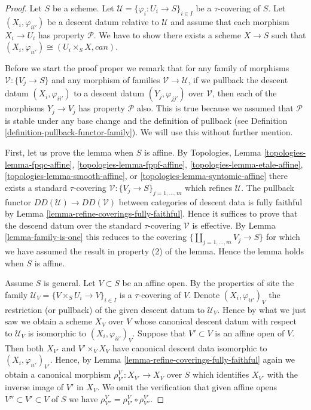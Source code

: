 \begin{proof}
Let $S$ be a scheme.
Let $\mathcal{U} = \{\varphi_i : U_i \to S\}_{i \in I}$
be a $\tau$-covering of $S$.
Let $(X_i, \varphi_{ii'})$ be a descent datum relative to
$\mathcal{U}$ and assume that each morphism $X_i \to U_i$ has property
$\mathcal{P}$. We have to show there exists a scheme $X \to S$ such that
$(X_i, \varphi_{ii'}) \cong (U_i \times_S X, can)$.

\medskip\noindent
Before we start the proof proper we remark that for any
family of morphisms $\mathcal{V} : \{V_j \to S\}$ and any
morphism of families $\mathcal{V} \to \mathcal{U}$, if we pullback
the descent datum $(X_i, \varphi_{ii'})$ to a descent datum
$(Y_j, \varphi_{jj'})$ over $\mathcal{V}$, then each of the
morphisms $Y_j \to V_j$ has property $\mathcal{P}$ also.
This is true because we assumed that $\mathcal{P}$ is stable
under any base change and the definition of pullback
(see Definition \ref{definition-pullback-functor-family}).
We will use this without further mention.

\medskip\noindent
First, let us prove the lemma when $S$ is affine.
By Topologies, Lemma
\ref{topologies-lemma-fpqc-affine},
\ref{topologies-lemma-fppf-affine},
\ref{topologies-lemma-etale-affine},
\ref{topologies-lemma-smooth-affine}, or
\ref{topologies-lemma-syntomic-affine}
there exists a standard $\tau$-covering
$\mathcal{V} : \{V_j \to S\}_{j = 1, \ldots, m}$
which refines $\mathcal{U}$. The pullback functor
$DD(\mathcal{U}) \to DD(\mathcal{V})$
between categories of descent data is fully faithful
by Lemma \ref{lemma-refine-coverings-fully-faithful}.
Hence it suffices to prove that the descend datum over
the standard $\tau$-covering $\mathcal{V}$ is effective.
By Lemma \ref{lemma-family-is-one} this reduces to the covering
$\{\coprod_{j = 1, \ldots, m} V_j \to S\}$ for which we have
assumed the result in property (2) of the lemma.
Hence the lemma holds when $S$ is affine.

\medskip\noindent
Assume $S$ is general. Let $V \subset S$ be an affine open.
By the properties of site the family
$\mathcal{U}_V = \{V \times_S U_i \to V\}_{i \in I}$ is a
$\tau$-covering of $V$. Denote
$(X_i, \varphi_{ii'})_V$ the restriction (or pullback) of
the given descent datum to $\mathcal{U}_V$.
Hence by what we just saw we obtain a scheme $X_V$ over $V$
whose canonical descent datum with respect to
$\mathcal{U}_V$ is isomorphic to $(X_i, \varphi_{ii'})_V$.
Suppose that $V' \subset V$ is an affine open of $V$.
Then both $X_{V'}$ and $V' \times_V X_V$ have canonical
descent data isomorphic to $(X_i, \varphi_{ii'})_{V'}$.
Hence, by Lemma \ref{lemma-refine-coverings-fully-faithful}
again we obtain a canonical morphism
$\rho^V_{V'} : X_{V'} \to X_V$ over $S$ which identifies
$X_{V'}$ with the inverse image of $V'$ in $X_V$.
We omit the verification that given affine opens
$V'' \subset V' \subset V$ of $S$ we have
$\rho^V_{V''} = \rho^V_{V'} \circ \rho^{V'}_{V''}$.


\end{proof}
